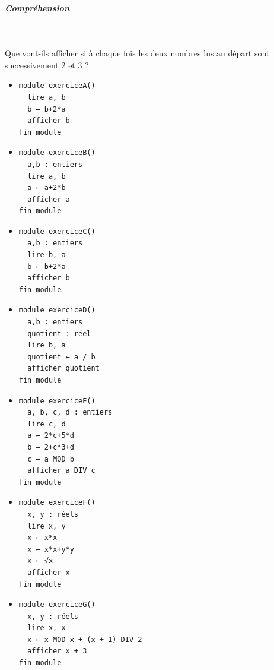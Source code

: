 \documentclass[11pt,a4paper]{article}
\begin{document}
			
		\subparagraph{Compr\'ehension} 
		
                \textcolor{white}{.} \par
            
							  Que vont-ils afficher si \`a chaque fois les deux nombres lus au d\'epart sont successivement 2 et 3 ?
							
					\begin{itemize}
				
			\item \begin{verbatim}
module exerciceA()
  lire a, b
  b ← b+2*a
  afficher b
fin module
				\end{verbatim} \textcolor{gray}{\underline{\hspace*{1em}}} 
			\item \begin{verbatim}
module exerciceB()
  a,b : entiers
  lire a, b
  a ← a+2*b
  afficher a
fin module
				\end{verbatim} \textcolor{gray}{\underline{\hspace*{1em}}} 
			\item \begin{verbatim}
module exerciceC()
  a,b : entiers
  lire b, a
  b ← b+2*a
  afficher b
fin module
				\end{verbatim} \textcolor{gray}{\underline{\hspace*{1em}}} 
			\item \begin{verbatim}
module exerciceD()
  a,b : entiers
  quotient : réel
  lire b, a
  quotient ← a / b
  afficher quotient
fin module
				\end{verbatim} \textcolor{gray}{\underline{\hspace*{2em}}} 
			\item \begin{verbatim}
module exerciceE()
  a, b, c, d : entiers
  lire c, d
  a ← 2*c+5*d
  b ← 2+c*3+d
  c ← a MOD b
  afficher a DIV c
fin module
				\end{verbatim} \textcolor{gray}{\underline{\hspace*{1em}}} 
			\item \begin{verbatim}
module exerciceF()
  x, y : réels
  lire x, y
  x ← x*x 
  x ← x*x+y*y 
  x ← √x
  afficher x
fin module
				\end{verbatim} \textcolor{gray}{\underline{\hspace*{1em}}} 
			\item \begin{verbatim}
module exerciceG()
  x, y : réels
  lire x, x
  x ← x MOD x + (x + 1) DIV 2
  afficher x + 3
fin module
				\end{verbatim} \textcolor{gray}{\underline{\hspace*{1em}}} 
					\end{itemize}
				
\end{document}
